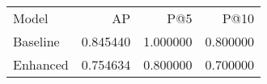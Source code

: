 \begin{tabular}{lrrr}
Model & AP & P@5 & P@10 \\
Baseline & 0.845440 & 1.000000 & 0.800000 \\
Enhanced & 0.754634 & 0.800000 & 0.700000 \\
\end{tabular}
